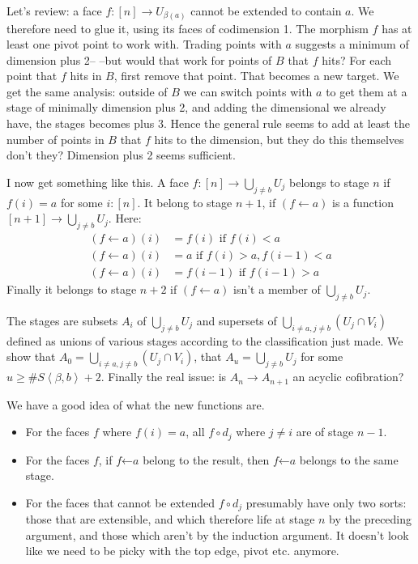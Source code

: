 \documentclass{tac}
\newcommand\of{:}
\newcommand\tuplet[1]{\left\langle #1 \right\rangle}
\begin{document}
Let's review: a face $f\of [n]\to U_{\beta(a)}$ cannot be extended to contain $a$. We therefore need to glue it, using its faces of codimension 1. The morphism $f$ has at least one pivot point to work with. Trading points with $a$ suggests a minimum of dimension plus 2-- --but would that work for points of $B$ that $f$ hits?
For each point that $f$ hits in $B$, first remove that point. That becomes a new target. We get the same analysis: outside of $B$ we can switch points with $a$ to get them at a stage of minimally dimension plus 2, and adding the dimensional we already have, the stages becomes plus 3. Hence the general rule seems to add at least the number of points in $B$ that $f$ hits to the dimension, but they do this themselves don't they? Dimension plus 2 seems sufficient.

I now get something like this. A face $f\of [n] \to \bigcup_{j\neq b}U_j$ belongs to stage $n$ if $f(i) = a$ for some $i\of [n]$. It belong to stage $n + 1$, if $(f \leftarrow a)$ is a function $[n + 1] \to \bigcup_{j\neq b}U_j$. Here:
\begin{align*}
(f \mathop\leftarrow a) (i) &= f(i) \textrm{ if } f(i) < a\\
(f \mathop\leftarrow a) (i) &= a \textrm{ if } f(i) > a, f(i - 1) < a \\
(f \mathop\leftarrow a) (i) &= f(i - 1) \textrm{ if } f(i - 1) > a
\end{align*}
Finally it belongs to stage $n + 2$ if $(f \leftarrow a)$ isn't a member of $\bigcup_{j\neq b}U_j$.

The stages are subsets $A_i$ of $\bigcup_{j\neq b}U_j$ and supersets of $\bigcup_{i\neq a,j\neq b}(U_j\cap V_i)$ defined as unions of various stages according to the classification just made. We show that $A_0 = \bigcup_{i\neq a,j\neq b}(U_j\cap V_i)$, that $A_u = \bigcup_{j\neq b}U_j$ for some $u\geq\#S\tuplet{\beta,b}+2$. Finally the real issue: is $A_n \to A_{n+1}$ an acyclic cofibration?

We have a good idea of what the new functions are. 
\begin{itemize}
\item For the faces $f$ where $f(i) = a$, all $f\circ d_j$ where $j\neq i$ are of stage $n - 1$.
\item For the faces $f$, if $f \mathord\leftarrow a$ belong to the result, then $f\mathord\leftarrow a$ belongs to the same stage.
\item For the faces that cannot be extended $f\circ d_j$ presumably have only two sorts: those that are extensible, and which therefore life at stage $n$ by the preceding argument, and those which aren't by the induction argument. It doesn't look like we need to be picky with the top edge, pivot etc. anymore.
\end{itemize}
\end{document}
